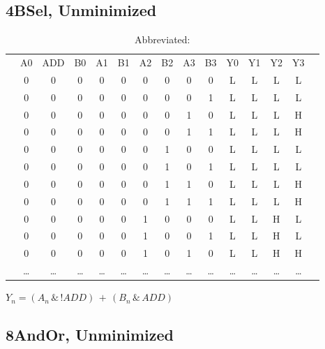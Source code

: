 \documentclass[letterpaper,titlepage,oneside]{article}
\begin{document}
\pagebreak
\subsection*{4BSel, Unminimized}

\begin{table}['h']
\begin{center}

\begin{tabular}{c|c|c|c|c|c|c|c|c|c|c|c|c|c|c}
\cline{2-14}
 & A0 & ADD & B0 & A1 & B1 & A2 & B2 & A3 & B3 & Y0 & Y1 & Y2 & Y3 &  \\ \cline{2-14}

 & 0 & 0 & 0 & 0 & 0 & 0 & 0 & 0 & 0 & L & L & L & L\\
 & 0 & 0 & 0 & 0 & 0 & 0 & 0 & 0 & 1 & L & L & L & L\\
 & 0 & 0 & 0 & 0 & 0 & 0 & 0 & 1 & 0 & L & L & L & H\\
 & 0 & 0 & 0 & 0 & 0 & 0 & 0 & 1 & 1 & L & L & L & H\\
 & 0 & 0 & 0 & 0 & 0 & 0 & 1 & 0 & 0 & L & L & L & L\\
 & 0 & 0 & 0 & 0 & 0 & 0 & 1 & 0 & 1 & L & L & L & L\\
 & 0 & 0 & 0 & 0 & 0 & 0 & 1 & 1 & 0 & L & L & L & H\\
 & 0 & 0 & 0 & 0 & 0 & 0 & 1 & 1 & 1 & L & L & L & H\\
 & 0 & 0 & 0 & 0 & 0 & 1 & 0 & 0 & 0 & L & L & H & L\\
 & 0 & 0 & 0 & 0 & 0 & 1 & 0 & 0 & 1 & L & L & H & L\\
 & 0 & 0 & 0 & 0 & 0 & 1 & 0 & 1 & 0 & L & L & H & H\\
 & \ldots{} & \ldots{} & \ldots{} & \ldots{} & \ldots{} & \ldots{} & %
\ldots{} & \ldots{} & \ldots{} & \ldots{} & \ldots{} & \ldots{} & \ldots{} &\\
\cline{2-14}
\end{tabular}
\caption{Abbreviated: }\label{table:4BSel_Unminimized}

\begin{small}
$Y_{n} = (A_{n} \,\&\, !ADD) \,+\, (B_{n} \,\&\, ADD)$

\end{small}

\end{center}
\end{table}


\subsection*{8AndOr, Unminimized}
\end{document}
